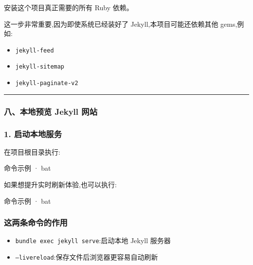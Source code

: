 \documentclass[lang=cn,scheme=chinese,color=blue,device=normal,toc=onecol,math=cm]{elegantbook}
\begin{document}
安装这个项目真正需要的所有 Ruby 依赖。\par


这一步非常重要,因为即使系统已经装好了 Jekyll,本项目可能还依赖其他 gems,例如:\par


\begin{itemize}
\item \texttt{jekyll-feed}
\item \texttt{jekyll-sitemap}
\item \texttt{jekyll-paginate-v2}
\end{itemize}


\medskip\hrule\medskip


\subsubsection{八、本地预览 Jekyll 网站}


\subsubsection{1. 启动本地服务}


在项目根目录执行:\par


\begin{inlinecodebox}{命令示例 · bat}
\end{inlinecodebox}


如果想提升实时刷新体验,也可以执行:\par


\begin{inlinecodebox}{命令示例 · bat}
\end{inlinecodebox}


\subsubsection{这两条命令的作用}


\begin{itemize}
\item \texttt{bundle exec jekyll serve}:启动本地 Jekyll 服务器
\item \texttt{--livereload}:保存文件后浏览器更容易自动刷新
\end{itemize}
\end{document}
